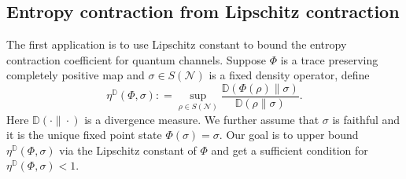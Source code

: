 \documentclass[11pt,reqno]{amsart}
\numberwithin{equation}{section}
\newcommand{\mb}{\mathbb}
\newcommand{\mc}{\mathcal}
\begin{document}
\subsection{Entropy contraction from Lipschitz contraction}
The first application is to use Lipschitz constant to bound the entropy contraction coefficient for quantum channels. Suppose $\Phi$ is a trace preserving completely positive map and $\sigma \in S(\mc N)$ is a fixed density operator, define 
\begin{equation}\label{def:entropy contraction general}
    \eta^{\mb D}(\Phi,\sigma): =\sup_{\rho \in S(\mc N)} \frac{\mb D(\Phi(\rho) \| \sigma)}{\mb D(\rho \| \sigma)}.
\end{equation}
Here $\mb D(\cdot \| \cdot)$ is a divergence measure. We further assume that $\sigma$ is faithful and it is the unique fixed point state $\Phi(\sigma) = \sigma$. Our goal is to upper bound $\eta^{\mb D}(\Phi,\sigma)$ via the Lipschitz constant of $\Phi$ and get a sufficient condition for $\eta^{\mb D}(\Phi,\sigma) < 1$.
\end{document}
